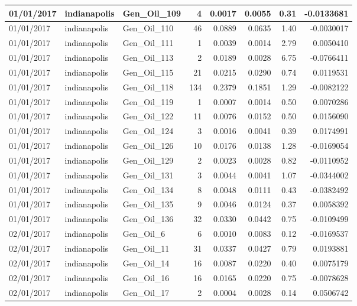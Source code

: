 \documentclass[
  letterpaper,
  DIV=11,
  numbers=noendperiod]{scrartcl}
\begin{document}
\begin{tabular}{l|l|l|r|r|r|r|r}
\hline
01/01/2017 & indianapolis & Gen\_Oil\_109 & 4 & 0.0017 & 0.0055 & 0.31 & -0.0133681\\
\hline
01/01/2017 & indianapolis & Gen\_Oil\_110 & 46 & 0.0889 & 0.0635 & 1.40 & -0.0030017\\
\hline
01/01/2017 & indianapolis & Gen\_Oil\_111 & 1 & 0.0039 & 0.0014 & 2.79 & 0.0050410\\
\hline
01/01/2017 & indianapolis & Gen\_Oil\_113 & 2 & 0.0189 & 0.0028 & 6.75 & -0.0766411\\
\hline
01/01/2017 & indianapolis & Gen\_Oil\_115 & 21 & 0.0215 & 0.0290 & 0.74 & 0.0119531\\
\hline
01/01/2017 & indianapolis & Gen\_Oil\_118 & 134 & 0.2379 & 0.1851 & 1.29 & -0.0082122\\
\hline
01/01/2017 & indianapolis & Gen\_Oil\_119 & 1 & 0.0007 & 0.0014 & 0.50 & 0.0070286\\
\hline
01/01/2017 & indianapolis & Gen\_Oil\_122 & 11 & 0.0076 & 0.0152 & 0.50 & 0.0156090\\
\hline
01/01/2017 & indianapolis & Gen\_Oil\_124 & 3 & 0.0016 & 0.0041 & 0.39 & 0.0174991\\
\hline
01/01/2017 & indianapolis & Gen\_Oil\_126 & 10 & 0.0176 & 0.0138 & 1.28 & -0.0169054\\
\hline
01/01/2017 & indianapolis & Gen\_Oil\_129 & 2 & 0.0023 & 0.0028 & 0.82 & -0.0110952\\
\hline
01/01/2017 & indianapolis & Gen\_Oil\_131 & 3 & 0.0044 & 0.0041 & 1.07 & -0.0344002\\
\hline
01/01/2017 & indianapolis & Gen\_Oil\_134 & 8 & 0.0048 & 0.0111 & 0.43 & -0.0382492\\
\hline
01/01/2017 & indianapolis & Gen\_Oil\_135 & 9 & 0.0046 & 0.0124 & 0.37 & 0.0058392\\
\hline
01/01/2017 & indianapolis & Gen\_Oil\_136 & 32 & 0.0330 & 0.0442 & 0.75 & -0.0109499\\
\hline
02/01/2017 & indianapolis & Gen\_Oil\_6 & 6 & 0.0010 & 0.0083 & 0.12 & -0.0169537\\
\hline
02/01/2017 & indianapolis & Gen\_Oil\_11 & 31 & 0.0337 & 0.0427 & 0.79 & 0.0193881\\
\hline
02/01/2017 & indianapolis & Gen\_Oil\_14 & 16 & 0.0087 & 0.0220 & 0.40 & 0.0075179\\
\hline
02/01/2017 & indianapolis & Gen\_Oil\_16 & 16 & 0.0165 & 0.0220 & 0.75 & -0.0078628\\
\hline
02/01/2017 & indianapolis & Gen\_Oil\_17 & 2 & 0.0004 & 0.0028 & 0.14 & 0.0506742\\

\end{tabular}
\end{document}
